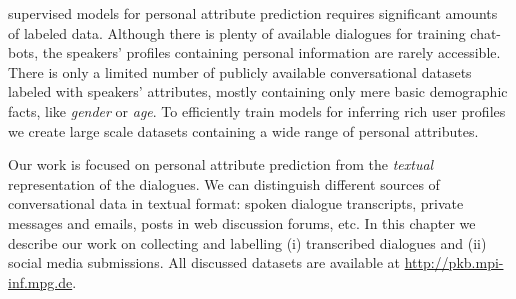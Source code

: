  supervised models for personal attribute prediction requires significant amounts of labeled data. Although there is plenty of available dialogues for training chat-bots, the speakers' profiles containing personal information are rarely accessible. There is only a limited number of publicly available conversational datasets labeled with speakers' attributes, mostly containing only mere basic demographic facts, like \textit{gender} or \textit{age}. To efficiently train models for inferring rich user profiles we create large scale datasets containing a wide range of personal attributes.

Our work is focused on personal attribute prediction from the \textit{textual} representation of the dialogues. We can distinguish different sources of conversational data in textual format: spoken dialogue transcripts, private messages and emails, posts in web discussion forums, etc. In this chapter we describe our work on collecting and labelling (i) transcribed dialogues and (ii) social media submissions. All discussed datasets are available at \url{http://pkb.mpi-inf.mpg.de}.


